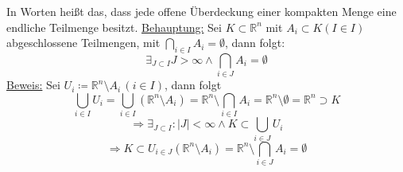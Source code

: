 \begin{itemize}
	In Worten heißt das, dass jede offene Überdeckung einer kompakten Menge eine endliche Teilmenge besitzt.
	\underline{Behauptung:}
		Sei $K \subset \mathbb{R}^n$ mit $A_i \subset K (I \in I)$ abgeschlossene Teilmengen, mit $\bigcap_{i \in I} A_i = \emptyset$, dann folgt:
		\[ \exists_{J \subset I} J > \infty \wedge \bigcap_{i \in J} A_i = \emptyset \]
	\underline{Beweis:}
		Sei $U_i \coloneqq \mathbb{R}^n \setminus A_i \, (i \in I)$, dann folgt
		\[ \bigcup_{i \in I} U_i = \bigcup_{i \in I} (\mathbb{R}^n \setminus A_i) = \mathbb{R}^n \setminus \bigcap_{i \in I} A_i = \mathbb{R}^n \setminus \emptyset = \mathbb{R}^n \supset K \]
		\[\Rightarrow \exists_{J \subset I}\colon |J| < \infty \wedge K \subset \bigcup_{i \in J} U_i\]
		\[\Rightarrow K \subset U_{i \in J} (\mathbb{R}^n \setminus A_i) = \mathbb{R}^n \setminus \bigcap_{i \in J} A_i = \emptyset\]
 \end{itemize}
